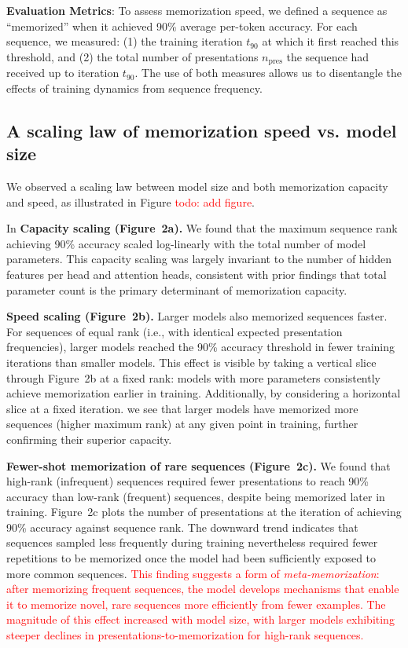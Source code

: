 \documentclass{article}
\theoremstyle{plain}
\theoremstyle{definition}
\theoremstyle{remark}
\begin{document}
\textbf{Evaluation Metrics}:
To assess memorization speed, we defined a sequence as ``memorized'' 
when it achieved 90\% average per-token accuracy. 
For each sequence, we measured: (1) the training iteration $t_{90}$ at which it first reached this threshold,
 and (2) the total number of presentations $n_{\text{pres}}$ the sequence had received up to iteration $t_{90}$. 
 The use of both measures allows us to disentangle the effects of training dynamics from sequence frequency.

\subsection{A scaling law of memorization speed vs. model size}

We observed a scaling law between model size and both memorization capacity and speed, 
as illustrated in Figure \textcolor{red}{todo: add figure}. 

In \textbf{Capacity scaling (Figure~2a).} We found that the maximum sequence rank achieving 90\% accuracy 
scaled log-linearly with the total number of model parameters. 
 This capacity scaling was largely invariant to the number of hidden features per head and attention heads,
  consistent with prior findings that total parameter count is the primary determinant of memorization capacity.

\textbf{Speed scaling (Figure~2b).} Larger models also memorized sequences faster.  
For sequences of equal rank (i.e., with identical expected presentation frequencies), 
larger models reached the 90\% accuracy threshold in fewer training iterations than smaller models. 
This effect is visible by taking a vertical slice through Figure~2b at a fixed rank: 
models with more parameters consistently achieve memorization earlier in training. 
Additionally, by considering a horizontal slice at a fixed iteration.
 we see that larger models have memorized more sequences (higher maximum rank) at any given point in training,
  further confirming their superior capacity.

\textbf{Fewer-shot memorization of rare sequences (Figure~2c).}  
We found that high-rank (infrequent) sequences required fewer presentations 
to reach 90\% accuracy than low-rank (frequent) sequences, despite being memorized later in training.
 Figure~2c plots the number of presentations at the iteration of achieving 90\% accuracy against sequence rank. 
 The downward trend indicates that sequences sampled less frequently during training nevertheless required fewer repetitions 
 to be memorized once the model had been sufficiently exposed to more common sequences. 
 \textcolor{red}{This finding suggests a form of \textit{meta-memorization}: 
 after memorizing frequent sequences, the model develops mechanisms that enable it to memorize novel, 
 rare sequences more efficiently from fewer examples. 
 The magnitude of this effect increased with model size,
  with larger models exhibiting steeper declines in presentations-to-memorization for high-rank sequences.}
\end{document}

